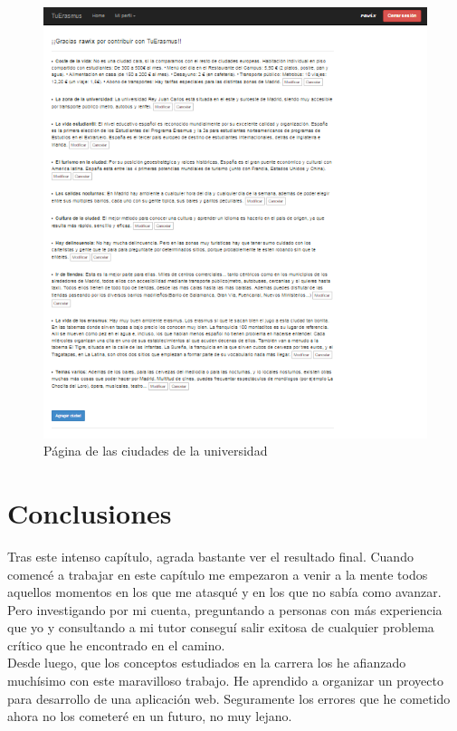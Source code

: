 \begin{figure}[htbp]
	
	\centering
	\includegraphics[scale=0.5]{./Figuras/tuerasmusPages/privatePages/uniCiudades.png}
	\caption{P\'agina de las ciudades de la universidad}
	\label{fig:uniC}
	
\end{figure}

\section{Conclusiones}
Tras este intenso cap\'itulo, agrada bastante ver el resultado final. Cuando comenc\'e a trabajar en este cap\'itulo me empezaron a venir a la mente todos aquellos momentos en los que me atasqu\'e y en los que no sab\'ia como avanzar. Pero investigando por mi cuenta, preguntando a personas con m\'as experiencia que yo y consultando a mi tutor consegu\'i salir exitosa de cualquier problema cr\'itico que he encontrado en el camino.\\

Desde luego, que los conceptos estudiados en la carrera los he afianzado much\'isimo con este maravilloso trabajo. He aprendido a organizar un proyecto para desarrollo de una aplicaci\'on web. Seguramente los errores que he cometido ahora no los cometer\'e en un futuro, no muy lejano.\\
